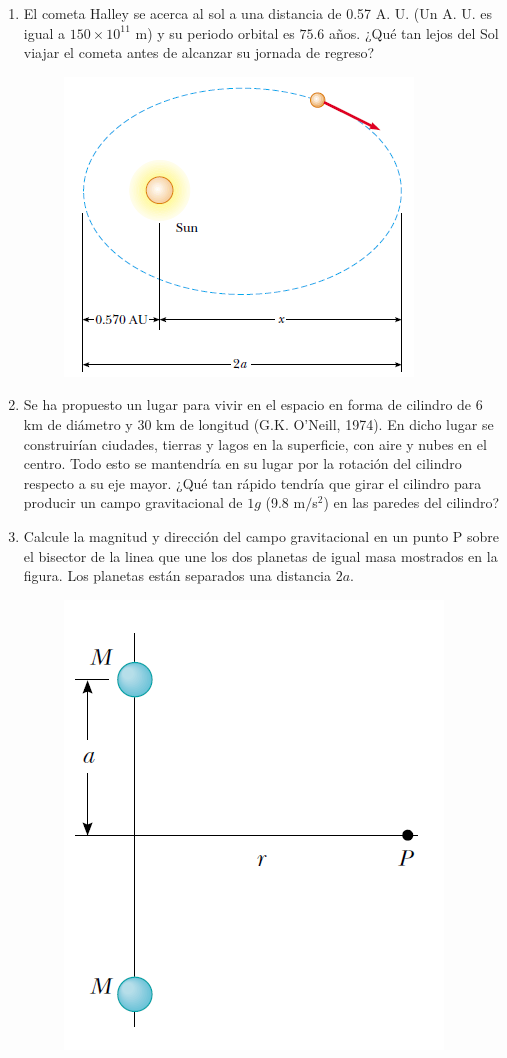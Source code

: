 \documentclass[11pt,twocolumn]{article}
\begin{document}
\begin{enumerate}
\item El cometa Halley se acerca al sol a una distancia de 0.57 A. U. (Un A. U. es igual a $150 \times 10^{11}$ m) y su periodo orbital es $75.6$ años. ¿Qué tan lejos del Sol viajar el cometa antes de alcanzar su jornada de regreso?
\begin{figure}[h]
\centering
\includegraphics[scale=0.55]{fig2}
\end{figure}

\item Se ha propuesto un lugar para vivir en el espacio en forma de cilindro de $6$ km de diámetro y $30$ km de longitud (G.K. O'Neill, 1974). En dicho lugar se construirían ciudades, tierras y lagos en la superficie, con aire y nubes en el centro. Todo esto se mantendría en su lugar por la rotación del cilindro respecto a su eje mayor. ¿Qué tan rápido tendría que girar el cilindro para producir un campo gravitacional de $1 g$ (9.8 m$/$s$^{2}$) en las paredes del cilindro?


\item Calcule la magnitud y dirección del campo gravitacional en un punto P sobre el bisector de la linea que une los dos planetas de igual masa mostrados en la figura. Los planetas están separados una distancia $2a$.
\begin{figure}[h]
\centering
\includegraphics[scale=0.4]{fig6}
\end{figure}


\end{enumerate}
\end{document}
